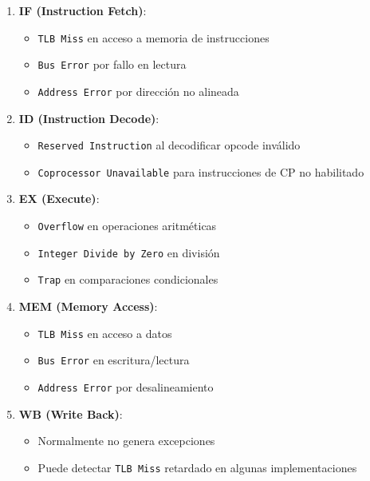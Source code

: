 \documentclass{article}
\begin{document}
\begin{enumerate}
    \item \textbf{IF (Instruction Fetch)}:
    \begin{itemize}
        \item \texttt{TLB Miss} en acceso a memoria de instrucciones
        \item \texttt{Bus Error} por fallo en lectura
        \item \texttt{Address Error} por dirección no alineada
    \end{itemize}

    \item \textbf{ID (Instruction Decode)}:
    \begin{itemize}
        \item \texttt{Reserved Instruction} al decodificar opcode inválido
        \item \texttt{Coprocessor Unavailable} para instrucciones de CP no habilitado
    \end{itemize}

    \item \textbf{EX (Execute)}:
    \begin{itemize}
        \item \texttt{Overflow} en operaciones aritméticas
        \item \texttt{Integer Divide by Zero} en división
        \item \texttt{Trap} en comparaciones condicionales
    \end{itemize}

    \item \textbf{MEM (Memory Access)}:
    \begin{itemize}
        \item \texttt{TLB Miss} en acceso a datos
        \item \texttt{Bus Error} en escritura/lectura
        \item \texttt{Address Error} por desalineamiento
    \end{itemize}

    \item \textbf{WB (Write Back)}:
    \begin{itemize}
        \item Normalmente no genera excepciones
        \item Puede detectar \texttt{TLB Miss} retardado en algunas implementaciones
    \end{itemize}
\end{enumerate}
\end{document}
